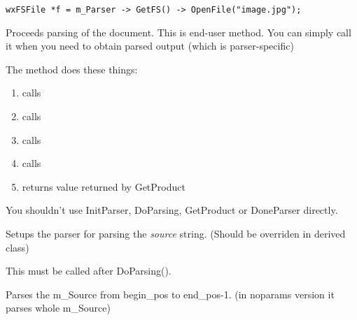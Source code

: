 \begin{verbatim}
wxFSFile *f = m_Parser -> GetFS() -> OpenFile("image.jpg");
\end{verbatim}


\label{wxhtmlparserparse}


Proceeds parsing of the document. This is end-user method. You can simply
call it when you need to obtain parsed output (which is parser-specific)

The method does these things:

\begin{enumerate}
\item calls 
\item calls 
\item calls 
\item calls 
\item returns value returned by GetProduct
\end{enumerate}

You shouldn't use InitParser, DoParsing, GetProduct or DoneParser directly.

\label{wxhtmlparserinitparser}


Setups the parser for parsing the {\it source} string. (Should be overriden
in derived class)


\label{wxhtmlparserdoneparser}


This must be called after DoParsing().


\label{wxhtmlparserdoparsing}



Parses the m\_Source from begin\_pos to end\_pos-1.
(in noparams version it parses whole m\_Source)

\label{wxhtmlparsergetproduct}

